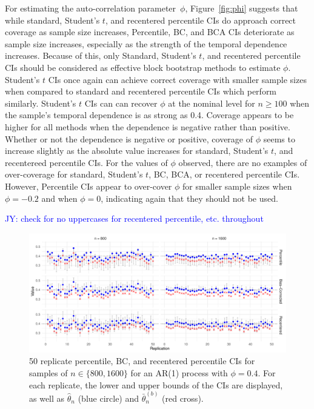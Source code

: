 \documentclass[12pt, letterpaper, titlepage]{article}
\newcommand{\jy}[1]{\textcolor{blue}{JY: #1}}
\begin{document}
For estimating the auto-correlation parameter~$\phi$, Figure~\ref{fig:phi}
suggests that while standard, Student's $t$, and recentered percentile CIs do
approach correct coverage as sample size increases, Percentile, BC, and
BCA CIs deteriorate as sample size increases, especially as the strength of
the temporal dependence increases. Because of this, only Standard, Student's
$t$, and recentered percentile CIs should be considered as effective block bootstrap
methods to estimate $\phi$. Student's $t$ CIs once again can achieve correct
coverage with smaller sample sizes when compared to standard and recentered percentile CIs
which perform similarly. Student's $t$ CIs can can recover $\phi$ at the
nominal level for $n \geq 100$ when the sample's temporal dependence is as
strong as 0.4. Coverage appears to be higher for all methods when the
dependence is negative rather than positive. Whether or not the dependence is
negative or positive, coverage of $\phi$ seems to increase slightly as the
absolute value increases for standard, Student's $t$, and recentereed percentile
CIs. For the values of $\phi$ observed, there are no examples
of over-coverage for standard, Student's $t$, BC, BCA, or recentered percentile CIs.
However, Percentile CIs appear to over-cover $\phi$ for smaller sample sizes when 
$\phi = -0.2$ and when $\phi = 0$, indicating again that they should not be used.

\jy{check for no uppercases for recentered percentile, etc. throughout}

\begin{figure}[tbp]
  \centering
  \includegraphics[width=\textwidth]{figures/norm_phi_intervals}
  \caption{50 replicate percentile, BC, and recentered percentile
    CIs for samples of $n \in \{800, 1600\}$ for an AR(1) process with
    $\phi = 0.4$. For each replicate, the lower and upper bounds of the CIs
    are displayed, as well as $\hat\theta_n$ (blue circle) and
    $\bar\theta_n^{(b)}$ (red cross). }
  \label{fig:npi}
\end{figure}
\end{document}
